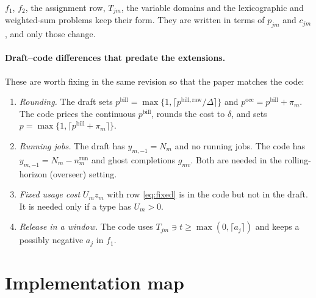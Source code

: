 \documentclass[11pt,a4paper]{article}
\newcommand{\bill}{\mathrm{bill}}
\newcommand{\occ}{\mathrm{occ}}
\newcommand{\run}{\mathrm{run}}
\begin{document}
\noindent $f_1$, $f_2$, the assignment row, $T_{jm}$, the variable domains and
the lexicographic and weighted-sum problems keep their form. They are written
in terms of $p_{jm}$ and $c_{jm}$, and only those change.

\paragraph{Draft--code differences that predate the extensions.} These are
worth fixing in the same revision so that the paper matches the code:
\begin{enumerate}[label=(\alph*),leftmargin=*]
\item \emph{Rounding.} The draft sets $p^\bill=\max\{1,\lceil p^{\bill,\mathrm{raw}}/\Delta\rceil\}$
  and $p^\occ=p^\bill+\pi_m$. The code prices the continuous $p^\bill$, rounds
  the cost to $\delta$, and sets $p=\max\{1,\lceil p^\bill+\pi_m\rceil\}$.
\item \emph{Running jobs.} The draft has $y_{m,-1}=N_m$ and no running jobs.
  The code has $y_{m,-1}=N_m-n^\run_m$ and ghost completions $g_{mv}$. Both
  are needed in the rolling-horizon (overseer) setting.
\item \emph{Fixed usage cost} $U_mz_m$ with row \eqref{eq:fixed} is in the
  code but not in the draft. It is needed only if a type has $U_m>0$.
\item \emph{Release in a window.} The code uses
  $T_{jm}\ni t\ge\max(0,\lceil a_j\rceil)$ and keeps a possibly negative $a_j$
  in $f_1$.
\end{enumerate}

\section{Implementation map}\label{sec:impl}
\end{document}
